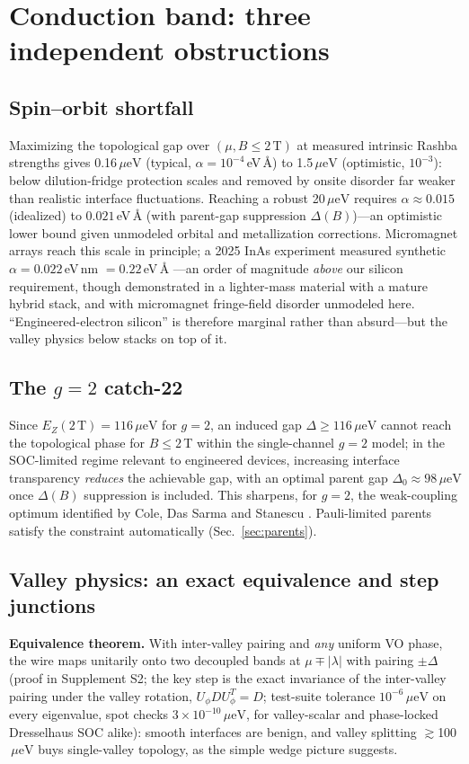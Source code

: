 \documentclass[11pt]{article}
\newcommand{\ueV}{\,\mu\mathrm{eV}}
\begin{document}


\section{Conduction band: three independent obstructions}
\subsection{Spin--orbit shortfall}\label{sec:soc}
Maximizing the topological gap over $(\mu, B \le 2\,\mathrm{T})$ at measured intrinsic
Rashba strengths gives 0.16$\ueV$ (typical, $\alpha = 10^{-4}$\,eV\,\AA) to 1.5$\ueV$
(optimistic, $10^{-3}$): below dilution-fridge protection scales and removed
by onsite disorder far weaker than realistic interface fluctuations. Reaching a robust 20$\ueV$ requires $\alpha \approx 0.015$
(idealized) to $0.021$\,eV\,\AA{} (with parent-gap suppression $\Delta(B)$)---an
optimistic lower bound given unmodeled orbital and metallization corrections.
Micromagnet arrays \cite{kjaergaard,turcotte} reach this scale in principle; a 2025
InAs experiment measured synthetic $\alpha = 0.022$\,eV\,nm $= 0.22$\,eV\,\AA{}
\cite{micromagnet2025}---an order of magnitude \emph{above} our silicon requirement,
though demonstrated in a lighter-mass material with a mature hybrid stack, and with
micromagnet fringe-field disorder unmodeled here. ``Engineered-electron silicon'' is
therefore marginal rather than absurd---but the valley physics below stacks on top of
it.

\subsection{The $g=2$ catch-22}\label{sec:catch}
Since $E_Z(2\,\mathrm{T}) = 116\ueV$ for $g=2$, an induced gap
$\Delta \ge 116\ueV$ cannot reach the topological phase for $B \le 2$\,T within
the single-channel $g=2$ model; in the
SOC-limited regime relevant to engineered devices, increasing interface transparency
\emph{reduces} the achievable gap, with an optimal parent gap
$\Delta_0 \approx 98\ueV$ once $\Delta(B)$ suppression is included. This sharpens, for
$g=2$, the weak-coupling optimum identified by Cole, Das Sarma and Stanescu
\cite{cole2015}. Pauli-limited parents satisfy the constraint automatically
(Sec.~\ref{sec:parents}).

\subsection{Valley physics: an exact equivalence and step junctions}\label{sec:valley}
\textbf{Equivalence theorem.} With inter-valley pairing and \emph{any} uniform VO
phase, the wire maps unitarily onto two decoupled bands at $\mu \mp |\lambda|$ with
pairing $\pm\Delta$ (proof in Supplement S2; the key step is the exact invariance
of the inter-valley pairing under the valley rotation, $U_\phi D U_\phi^T = D$;
test-suite tolerance $10^{-6}\ueV$ on every eigenvalue, spot checks
$3\times10^{-10}\ueV$, for valley-scalar and phase-locked Dresselhaus SOC
alike): smooth interfaces are benign, and valley
splitting $\gtrsim$100$\ueV$ buys single-valley topology, as the simple wedge picture
suggests.
\end{document}

